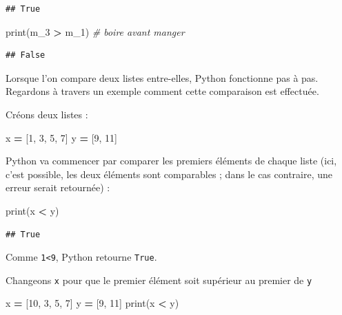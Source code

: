 \documentclass[12pt,]{book}
\newenvironment{Shaded}{\begin{snugshade}}{\end{snugshade}}
\newcommand{\DecValTok}[1]{\textcolor[rgb]{0.00,0.00,0.81}{#1}}
\newcommand{\CommentTok}[1]{\textcolor[rgb]{0.56,0.35,0.01}{\textit{#1}}}
\newcommand{\OperatorTok}[1]{\textcolor[rgb]{0.81,0.36,0.00}{\textbf{#1}}}
\newcommand{\BuiltInTok}[1]{#1}
\newcommand{\NormalTok}[1]{#1}
\numberwithin{equation}{section}
\numberwithin{countremarque}{section}
\begin{document}
\begin{lstlisting}
## True
\end{lstlisting}

\begin{Shaded}
\begin{Highlighting}[]
\BuiltInTok{print}\NormalTok{(m_3 }\OperatorTok{>}\NormalTok{ m_1) }\CommentTok{# boire avant manger}
\end{Highlighting}
\end{Shaded}

\begin{lstlisting}
## False
\end{lstlisting}

Lorsque l'on compare deux listes entre-elles, Python fonctionne pas à
pas. Regardons à travers un exemple comment cette comparaison est
effectuée.

Créons deux listes :

\begin{Shaded}
\begin{Highlighting}[]
\NormalTok{x }\OperatorTok{=}\NormalTok{ [}\DecValTok{1}\NormalTok{, }\DecValTok{3}\NormalTok{, }\DecValTok{5}\NormalTok{, }\DecValTok{7}\NormalTok{]}
\NormalTok{y }\OperatorTok{=}\NormalTok{ [}\DecValTok{9}\NormalTok{, }\DecValTok{11}\NormalTok{]}
\end{Highlighting}
\end{Shaded}

Python va commencer par comparer les premiers éléments de chaque liste
(ici, c'est possible, les deux éléments sont comparables ; dans le cas
contraire, une erreur serait retournée) :

\begin{Shaded}
\begin{Highlighting}[]
\BuiltInTok{print}\NormalTok{(x }\OperatorTok{<}\NormalTok{ y)}
\end{Highlighting}
\end{Shaded}

\begin{lstlisting}
## True
\end{lstlisting}

Comme \texttt{1\textless{}9}, Python retourne \texttt{True}.

Changeons \texttt{x} pour que le premier élément soit supérieur au
premier de \texttt{y}

\begin{Shaded}
\begin{Highlighting}[]
\NormalTok{x }\OperatorTok{=}\NormalTok{ [}\DecValTok{10}\NormalTok{, }\DecValTok{3}\NormalTok{, }\DecValTok{5}\NormalTok{, }\DecValTok{7}\NormalTok{]}
\NormalTok{y }\OperatorTok{=}\NormalTok{ [}\DecValTok{9}\NormalTok{, }\DecValTok{11}\NormalTok{]}
\BuiltInTok{print}\NormalTok{(x }\OperatorTok{<}\NormalTok{ y)}
\end{Highlighting}
\end{Shaded}
\end{document}
